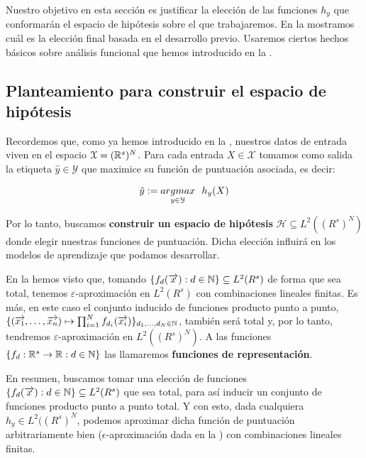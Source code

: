 Nuestro objetivo en esta sección es justificar la elección de las funciones $h_y$ que conformarán el espacio de hipótesis sobre el que trabajaremos. En la  mostramos cuál es la elección final basada en el desarrollo previo. Usaremos ciertos hechos básicos sobre análisis funcional que hemos introducido en la .

\subsection{Planteamiento para construir el espacio de hipótesis} \label{sec:justificacion_func_repr}

Recordemos que, como ya hemos introducido en la , nuestros datos de entrada viven en el espacio $\mathcal{X} = (\mathbb{R}^s)^N$. Para cada entrada $X \in \mathcal{X}$ tomamos como salida la etiqueta $\hat{y} \in \mathcal{Y}$ que maximice su función de puntuación asociada, es decir:

\begin{equation}
	\hat{y} := \underset{y \in \mathcal{Y}}{argmax} \ \  h_y(X)
\end{equation}

Por lo tanto, buscamos \textbf{construir un espacio de hipótesis} $\mathcal{H} \subseteq L^2((R^s)^N)$ donde elegir nuestras funciones de puntuación. Dicha elección influirá en los modelos de aprendizaje que podamos desarrollar.

En la  hemos visto que, tomando $\{f_d(\overrightarrow{x}): d \in \mathbb{N}\} \subseteq L^2(R^s)$ de forma que sea total, tenemos $\varepsilon$-aproximación en $L^2(R^s)$ con combinaciones lineales finitas. Es más, en este caso el conjunto inducido de funciones producto punto a punto, $\{(\overrightarrow{x_1}, \ldots, \overrightarrow{x_n}) \mapsto \prod_{i = 1}^N f_{d_i}(\overrightarrow{x_i}) \}_{d_1, \ldots, d_N \in \mathbb{N}}$, también será total y, por lo tanto, tendremos $\varepsilon$-aproximación en $L^2((R^s)^N)$. A las funciones $\{ f_d: \mathbb{R}^s \to \mathbb{R}: d \in \mathbb{N} \}$ las llamaremos \textbf{funciones de representación}.

En resumen, buscamos tomar una elección de funciones $\{f_d(\overrightarrow{x}): d \in \mathbb{N}\} \subseteq L^2(R^s)$ que sea total, para así inducir un conjunto de funciones producto punto a punto total. Y con esto, dada cualquiera $h_y \in L^2((R^s)^N$, podemos aproximar dicha función de puntuación arbitrariamente bien ($\epsilon$-aproximación dada en la ) con combinaciones lineales finitas.


